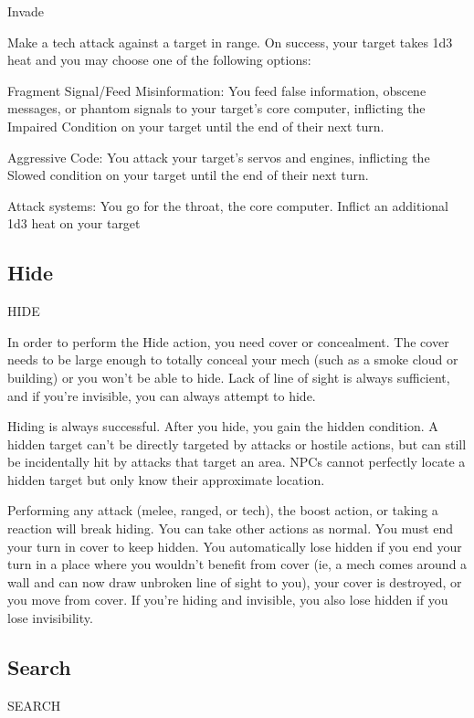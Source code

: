 Invade

Make a tech attack against a target in range. On success, your target takes 1d3 heat and you
may choose one of the following options:





         Fragment Signal/Feed Misinformation: You feed false information, obscene messages,
         or phantom signals to your target’s core computer, inflicting the Impaired Condition on
         your target until the end of their next turn.


         Aggressive Code: You attack your target’s servos and engines, inflicting the Slowed
         condition on your target until the end of their next turn.


         Attack systems: You go for the throat, the core computer. Inflict an additional 1d3 heat
         on your target

\subsection{Hide}

                                                      HIDE

In order to perform the Hide action, you need cover or concealment. The cover needs to be large
enough to totally conceal your mech (such as a smoke cloud or building) or you won’t be able to
hide. Lack of line of sight is always sufficient, and if you’re invisible, you can always attempt to
hide.


Hiding is always successful. After you hide, you gain the hidden condition. A hidden target can’t
be directly targeted by attacks or hostile actions, but can still be incidentally hit by attacks that
target an area. NPCs cannot perfectly locate a hidden target but only know their approximate
location.


Performing any attack (melee, ranged, or tech), the boost action, or taking a reaction will break
hiding. You can take other actions as normal. You must end your turn in cover to keep hidden.
You automatically lose hidden if you end your turn in a place where you wouldn’t benefit from
cover (ie, a mech comes around a wall and can now draw unbroken line of sight to you), your
cover is destroyed, or you move from cover. If you’re hiding and invisible, you also lose hidden if
you lose invisibility.

\subsection{Search}
                                                   SEARCH

